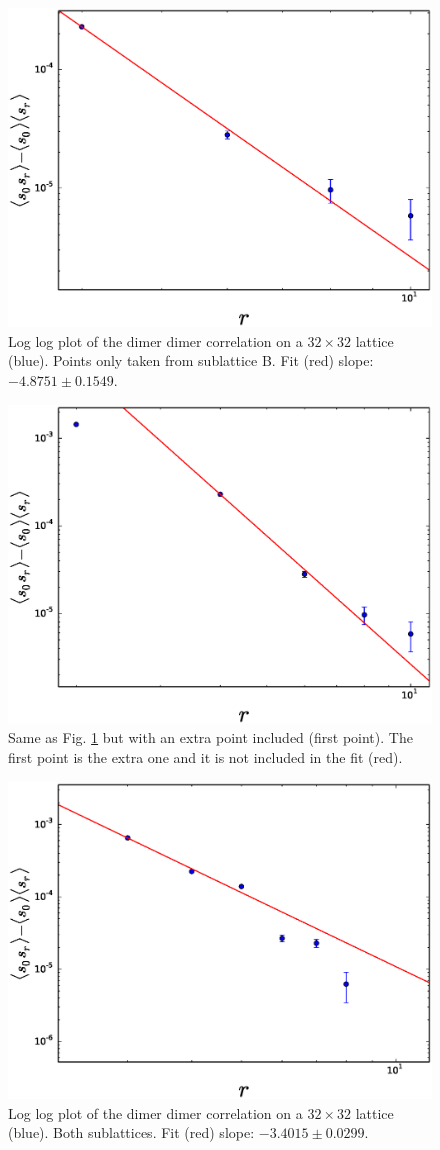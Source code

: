 \documentclass[aps,floatfix,11pt]{revtex4-1}
\begin{document}
\begin{figure}[h]
    \centering
    \includegraphics[width=8.5 cm]{s_dimer_dimer_cor_loglog_one_sublat_B_32x32}
    \caption{Log log plot of the dimer dimer correlation on a $32\times32$ lattice (blue). 
        Points only taken from sublattice B. Fit (red) slope: $-4.8751 \pm 0.1549$.
    \label{fig:s_dimer_dimer_cor_loglog_one_sublat_B_32x32}}
\end{figure}

\begin{figure}[h]
    \centering
    \includegraphics[width=8.5 cm]{s_dimer_dimer_cor_loglog_one_sublat_B_32x32_extra_pnt}
    \caption{Same as Fig. \ref{fig:s_dimer_dimer_cor_loglog_one_sublat_B_32x32} but with an extra
        point included (first point). The first point is the extra one and it is not included in the fit (red).
    \label{fig:s_dimer_dimer_cor_loglog_one_sublat_B_32x32_extra_pnt}}
\end{figure}

\begin{figure}[h]
    \centering
    \includegraphics[width=8.5 cm]{s_dimer_dimer_cor_loglog_both_sublat_32x32}
    \caption{Log log plot of the dimer dimer correlation on a $32\times32$ lattice (blue). 
        Both sublattices. Fit (red) slope: $-3.4015 \pm 0.0299$.
    \label{fig:s_dimer_dimer_cor_loglog_both_sublat_32x32}}
\end{figure}
\end{document}
